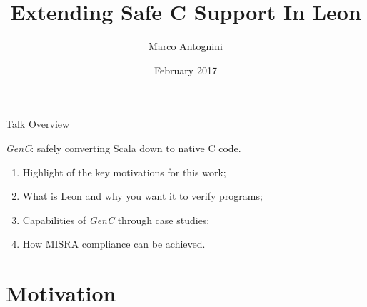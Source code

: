 \documentclass[xcolor={usenames,dvipsnames}]{beamer}
\title{Extending Safe C Support In Leon}
\date{February 2017}
\author{Marco Antognini}
\institute{Lab For Automated Reasoning And Analysis, EPFL}
\newcommand{\GenC}{\emph{GenC}\xspace}
\begin{document}
\maketitle

\begin{frame}{Talk Overview}

  \GenC: safely converting Scala down to native C code.

  \vfill

  \begin{enumerate}
    \item Highlight of the key motivations for this work;
    \item What is Leon and why you want it to verify programs;
    \item Capabilities of \GenC through case studies;
    \item How MISRA compliance can be achieved.
  \end{enumerate}

\end{frame}



\section{Motivation}
\end{document}
